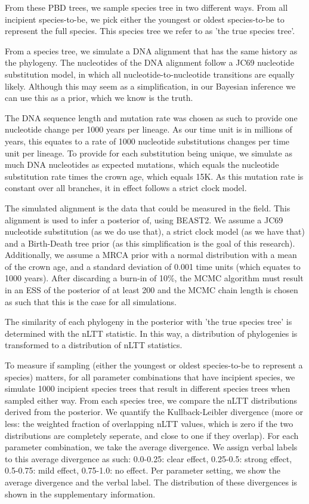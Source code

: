 \documentclass{article}
\begin{document}
From these PBD trees, we sample species tree in two different ways. 
From all incipient species-to-be, we pick either the youngest or oldest
species-to-be to represent the full species. This species tree we refer
to as 'the true species tree'.

From a species tree, we simulate a DNA alignment that has the same history
as the phylogeny. The nucleotides of the DNA alignment follow a JC69
nucleotide substitution model, in which all nucleotide-to-nucleotide transitions
are equally likely. Although this may seem as a simplification, in our Bayesian
inference we can use this as a prior, which we know is the truth.

The DNA sequence length and mutation rate was chosen as such to provide one
nucleotide change per 1000 years per lineage. As our time unit is in 
millions of years, this equates to a rate of 1000 nucleotide substitutions 
changes per time unit per lineage. To provide for each substitution being unique,
we simulate as much DNA nucleotides as expected mutations, which equals the
nucleotide substitution rate times the crown age, which equals 15K. As this
mutation rate is constant over all branches, it in effect follows a strict 
clock model.

The simulated alignment is the data that could be measured in the field.
This alignment is used to infer a posterior of, using BEAST2. We assume a
JC69 nucleotide substitution (as we do use that), a strict clock model (as
we have that) and a Birth-Death tree prior (as this simplification is the goal
of this research). Additionally, we assume a MRCA prior with a normal distribution
with a mean of the crown age, and a standard deviation of 0.001 time units (which
equates to 1000 years). After discarding a burn-in of 10\%, the MCMC algorithm must 
result in an ESS of the posterior of at least 200 and the MCMC chain length is 
chosen as such that this is the case for all simulations.

The similarity of each phylogeny in the posterior with 'the true species tree'
is determined with the nLTT statistic. In this way, a distribution of phylogenies
is transformed to a distribution of nLTT statistics. 

To measure if sampling (either the youngest or oldest species-to-be to represent
a species) matters, for all parameter combinations that have incipient species,
we simulate 1000 incipient species trees that result in different species trees
when sampled either way. From each species tree, we compare the nLTT distributions
derived from the posterior. We quantify the Kullback-Leibler divergence (more
or less: the weighted fraction of overlapping nLTT 
values, which is zero if the two distributions are completely seperate, and close
to one if they overlap). For each parameter combination, we take the average
divergence. We assign verbal labels to this average divergence as such: 
0.0-0.25: clear effect, 0.25-0.5: strong effect, 0.5-0.75: mild effect, 
0.75-1.0: no effect. Per parameter setting, we show the average divergence and the 
verbal label. The distribution of these divergences is shown in the 
supplementary information.
\end{document}
